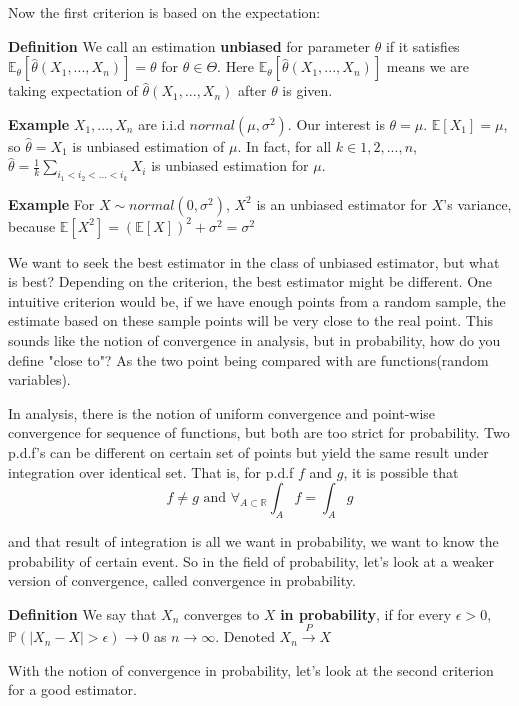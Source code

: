 \documentclass[a4paper,12pt]{article}
\begin{document}
Now the first criterion is based on the expectation:

\textbf{Definition} We call an estimation \textbf{unbiased} for parameter $\theta$ if it satisfies
$\mathbb{E}_\theta [\hat{\theta}( X_1, ..., X_n )] = \theta$ for $\theta \in \Theta$.
Here $\mathbb{E}_\theta [\hat{\theta}( X_1, ..., X_n )]$ means we are taking expectation of $\hat{\theta}( X_1, ..., X_n )$ after $\theta$ is given. 


\textbf{Example} $X_1, ..., X_n$ are i.i.d $normal( \mu, \sigma^2 )$. Our interest is $\theta = \mu$. $\mathbb{E}[X_1] = \mu$, so $\hat{\theta} = X_1$ is unbiased estimation of $\mu$. In fact, for all $k \in 1, 2, ..., n$, $\hat{\theta} = \frac{1}{k}\sum_{i_1 < i_2 < ...< i_k}X_i$ is unbiased estimation for $\mu$. 

\textbf{Example} For $X \sim normal(0, \sigma^2)$, $X^2$ is an unbiased estimator for $X$'s variance, because $\mathbb{E}[X^2] = (\mathbb{E}[X])^2 + \sigma^2 = \sigma^2$ 

We want to seek the best estimator in the class of unbiased estimator, but what is best? Depending on the criterion, the best estimator might be different. One intuitive criterion would be, if we have enough points from a random sample, the estimate based on these sample points will be very close to the real point. This sounds like the notion of convergence in analysis, but in probability, how do you define "close to"? As the two point being compared with are functions(random variables). 

In analysis, there is the notion of uniform convergence and point-wise convergence for sequence of functions, but both are too strict for probability. Two p.d.f's can be different on certain set of points but yield the same result under integration over identical set. That is, for p.d.f $f$ and $g$, it is possible that
$$f \neq g \text{ and } \forall_{A\subset \mathbb{R}} \int_A f = \int_A g$$

and that result of integration is all we want in probability, we want to know the probability of certain event. So in the field of probability, let's look at a weaker version of convergence, called convergence in probability. 

\textbf{Definition} We say that $X_n$ converges to $X$ \textbf{in probability}, if for every $\epsilon > 0$, $\mathbb{P}(|X_n-X|>\epsilon) \to 0$ as $n \to \infty$. Denoted $X_n \overset{P}{\to} X$ 

With the notion of convergence in probability, let's look at the second criterion for a good estimator. 
\end{document}
